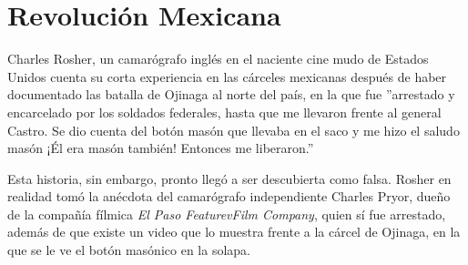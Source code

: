 \chapter{Revolución Mexicana}

Charles Rosher, un camarógrafo inglés en el naciente cine mudo de Estados Unidos cuenta su corta experiencia en las cárceles mexicanas después de haber documentado las batalla de Ojinaga al norte del país, en la que fue ''arrestado y encarcelado por los soldados federales, hasta que me llevaron frente al general Castro. Se dio cuenta del botón masón que llevaba en el saco y me hizo el saludo masón ¡Él era masón también! Entonces me liberaron.''\cite{rocha2003}

Esta historia, sin embargo, pronto llegó a ser descubierta como falsa. Rosher en realidad tomó la anécdota del camarógrafo independiente Charles Pryor, dueño de la compañía fílmica \emph{El Paso FeaturevFilm Company}\cite{worthington2010}, quien sí fue arrestado, además de que existe un video que lo muestra frente a la cárcel de Ojinaga, en la que se le ve el botón masónico en la solapa.